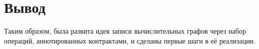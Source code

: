 \section{Вывод}

Таким образом, была развита идея записи вычислительных графов через набор операций, аннотированных контрактами, и сделаны первые шаги в её реализации.
